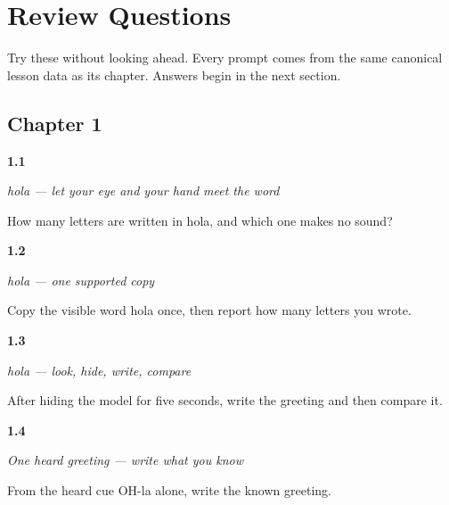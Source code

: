 
\chapter*{Review Questions}

Try these without looking ahead. Every prompt comes from the same canonical lesson data as its chapter. Answers begin in the next section.

\section*{Chapter 1}

\noindent\begin{minipage}[t]{\linewidth}
\raggedright
\hypertarget{review-ES-W00-hola-observe-final}{\textbf{1.1}} \emph{\emph{hola} — let your eye and your hand meet the word}\par
\small How many letters are written in hola, and which one makes no sound?
\end{minipage}\par\medskip

\noindent\begin{minipage}[t]{\linewidth}
\raggedright
\hypertarget{review-ES-W00-hola-guided-copy-check}{\textbf{1.2}} \emph{\emph{hola} — one supported copy}\par
\small Copy the visible word hola once, then report how many letters you wrote.
\end{minipage}\par\medskip

\noindent\begin{minipage}[t]{\linewidth}
\raggedright
\hypertarget{review-ES-W00-hola-delayed-copy-check}{\textbf{1.3}} \emph{\emph{hola} — look, hide, write, compare}\par
\small After hiding the model for five seconds, write the greeting and then compare it.
\end{minipage}\par\medskip

\noindent\begin{minipage}[t]{\linewidth}
\raggedright
\hypertarget{review-ES-W00-hola-dictation-answer}{\textbf{1.4}} \emph{One heard greeting — write what you know}\par
\small From the heard cue OH-la alone, write the known greeting.
\end{minipage}\par\medskip

